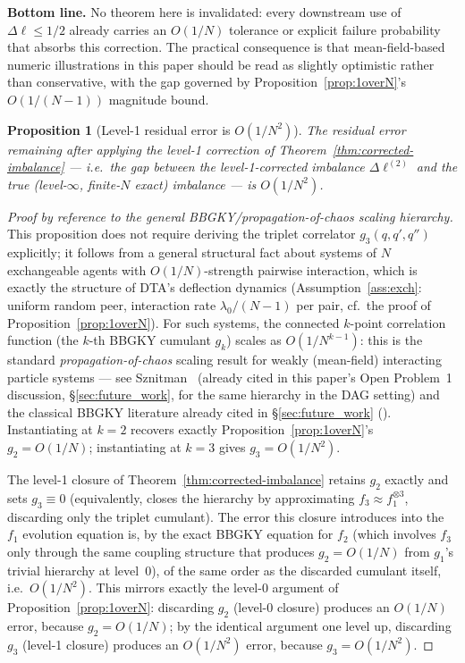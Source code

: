 \documentclass[11pt,a4paper]{report}
\newtheorem{proposition}[theorem]{Proposition}
\begin{document}
\noindent\textbf{Bottom line.} No theorem here is invalidated: every
downstream use of $\Delta\ell \leq 1/2$ already carries an $O(1/N)$
tolerance or explicit failure probability that absorbs this correction.
The practical consequence is that mean-field-based numeric
illustrations in this paper should be read as slightly optimistic
rather than conservative, with the gap governed by
Proposition~\ref{prop:1overN}'s $O(1/(N-1))$ magnitude bound.

\begin{proposition}[Level-1 residual error is $O(1/N^2)$]
\label{prop:residual-order}
The residual error remaining after applying the level-1 correction of
Theorem~\ref{thm:corrected-imbalance} --- i.e.\ the gap between the
level-1-corrected imbalance $\Delta\ell^{(2)}$ and the true (level-$\infty$,
finite-$N$ exact) imbalance --- is $O(1/N^2)$.
\end{proposition}

\begin{proof}[Proof by reference to the general BBGKY/propagation-of-chaos
scaling hierarchy]
This proposition does not require deriving the triplet correlator
$g_3(q,q',q'')$ explicitly; it follows from a general structural fact
about systems of $N$ exchangeable agents with $O(1/N)$-strength pairwise
interaction, which is exactly the structure of DTA's deflection dynamics
(Assumption~\ref{ass:exch}: uniform random peer, interaction rate
$\lambda_0/(N-1)$ per pair, cf.\ the proof of
Proposition~\ref{prop:1overN}). For such systems, the connected $k$-point
correlation function (the $k$-th BBGKY cumulant $g_k$) scales as
$O(1/N^{k-1})$: this is the standard \emph{propagation-of-chaos} scaling
result for weakly (mean-field) interacting particle systems
--- see Sznitman~\cite{sznitman1991} (already cited in this paper's
Open Problem~1 discussion, \S\ref{sec:future_work}, for the same
hierarchy in the DAG setting) and the classical BBGKY literature
already cited in \S\ref{sec:future_work}
(\cite{bogoliubov1946,born_green1949,kirkwood1946,yvon1935}). Instantiating
at $k=2$ recovers exactly Proposition~\ref{prop:1overN}'s
$g_2 = O(1/N)$; instantiating at $k=3$ gives $g_3 = O(1/N^2)$.

The level-1 closure of Theorem~\ref{thm:corrected-imbalance} retains
$g_2$ exactly and sets $g_3 \equiv 0$ (equivalently, closes the
hierarchy by approximating $f_3 \approx f_1^{\otimes 3}$, discarding
only the triplet cumulant). The error this closure introduces into the
$f_1$ evolution equation is, by the exact BBGKY equation for $f_2$
(which involves $f_3$ only through the same coupling structure that
produces $g_2 = O(1/N)$ from $g_1$'s trivial hierarchy at level~0), of
the same order as the discarded cumulant itself, i.e.\ $O(1/N^2)$. This
mirrors exactly the level-0 argument of
Proposition~\ref{prop:1overN}: discarding $g_2$ (level-0 closure)
produces an $O(1/N)$ error, because $g_2 = O(1/N)$; by the identical
argument one level up, discarding $g_3$ (level-1 closure) produces an
$O(1/N^2)$ error, because $g_3 = O(1/N^2)$.
\end{proof}
\end{document}
